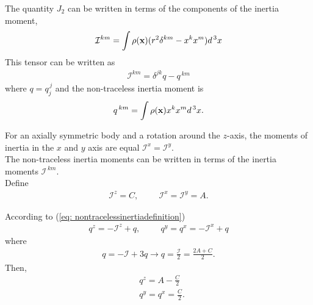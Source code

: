 The quantity $J_2$ can be written in terms of the components of the inertia moment\cite{Goldstain},
\begin{align}
\label{eq: inertiamomentgeneral}
	\mathcal{I}^{km} = \int \rho(\mathbf{x}) (r^2 \delta ^{km} - x^k x^m)  d^{\hspace{0.05cm}3}x
\end{align}
This tensor can be written as
\begin{align}
\label{eq: nontracelessinertiadefinition}
	\mathcal{I}^{km}  = \delta^{jk}q - q^{\,km} 
\end{align}
where $q = q^{\,j}_j$ and the non-traceless inertia moment is \cite{Brumberg}
\begin{align}
\label{eq: nontraclessinertiamoment}
	q^{\,km} = \int \rho(\mathbf{x}) x^k x^m  d^{\hspace{0.05cm}3}x.
\end{align}

For an axially symmetric body and a rotation around the $z$-axis, the moments of inertia in the $x$ and $y$ axis are equal $\mathcal{I}^{x} =\mathcal{I}^{y} $. \\%

The non-traceless inertia moments can be written in terms of the inertia moments $\mathcal{I}^{\,km}$.\\

Define
\begin{align}
\mathcal{I}^{z} = C , \hspace{1cm}
\mathcal{I}^{x} = \mathcal{I}^{y}  = A.
\end{align}

According to (\ref{eq: nontracelessinertiadefinition})
\begin{align*}
q^{z} = -\mathcal{I}^{z} + q, \hspace{1cm}
q^{y} = q^{x} = -\mathcal{I}^{x} + q
\end{align*}
where
\begin{align*}
 q = -\mathcal{I} + 3q \rightarrow q =  \frac{\mathcal{I}}{2} = \frac{2A+C}{2}.
\end{align*}
Then, 
\begin{subequations}
\label{eq: inertiamomentobrumberchipotential}
\begin{align}
&q^{z} = A - \frac{C}{2}\\
&q^{y} = q^{x} = \frac{C}{2}.
\end{align}
\end{subequations}

